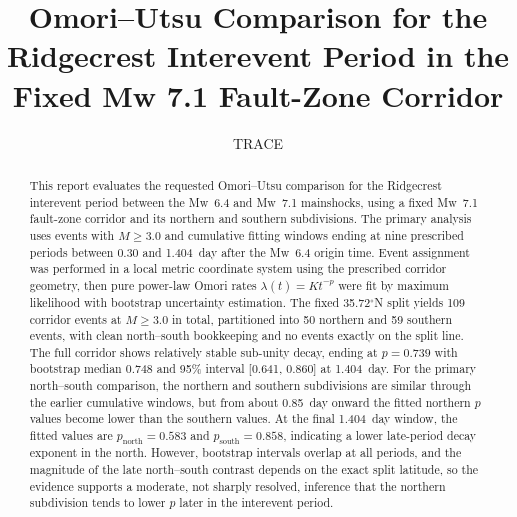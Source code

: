 \documentclass[11pt]{article}
\title{Omori--Utsu Comparison for the Ridgecrest Interevent Period in the Fixed Mw 7.1 Fault-Zone Corridor}
\author{TRACE}
\date{}
\begin{document}
\maketitle

\begin{abstract}
This report evaluates the requested Omori--Utsu comparison for the Ridgecrest interevent period between the Mw~6.4 and Mw~7.1 mainshocks, using a fixed Mw~7.1 fault-zone corridor and its northern and southern subdivisions. The primary analysis uses events with $M \geq 3.0$ and cumulative fitting windows ending at nine prescribed periods between 0.30 and 1.404~day after the Mw~6.4 origin time. Event assignment was performed in a local metric coordinate system using the prescribed corridor geometry, then pure power-law Omori rates $\lambda(t)=K t^{-p}$ were fit by maximum likelihood with bootstrap uncertainty estimation. The fixed 35.72$^{\circ}$N split yields 109 corridor events at $M \geq 3.0$ in total, partitioned into 50 northern and 59 southern events, with clean north--south bookkeeping and no events exactly on the split line. The full corridor shows relatively stable sub-unity decay, ending at $p=0.739$ with bootstrap median 0.748 and 95\% interval [0.641, 0.860] at 1.404~day. For the primary north--south comparison, the northern and southern subdivisions are similar through the earlier cumulative windows, but from about 0.85~day onward the fitted northern $p$ values become lower than the southern values. At the final 1.404~day window, the fitted values are $p_{\mathrm{north}}=0.583$ and $p_{\mathrm{south}}=0.858$, indicating a lower late-period decay exponent in the north. However, bootstrap intervals overlap at all periods, and the magnitude of the late north--south contrast depends on the exact split latitude, so the evidence supports a moderate, not sharply resolved, inference that the northern subdivision tends to lower $p$ later in the interevent period.
\end{abstract}
\end{document}
